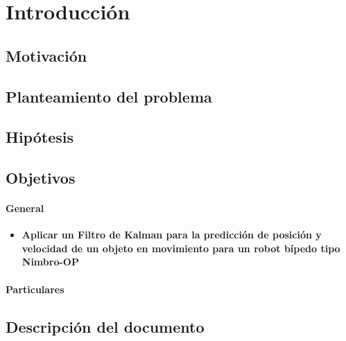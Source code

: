 \chapter{Introducción}

\section{Motivación}

\section{Planteamiento del problema}
\section{Hipótesis}

\section{Objetivos}
	\subsubsection{General}
		\begin{itemize}
			\item \textbf{Aplicar un Filtro de Kalman para la predicción de posición y velocidad de un objeto en movimiento para un robot bípedo tipo Nimbro-OP}
		\end{itemize}
	\subsubsection{Particulares}	
\section{Descripción del documento}